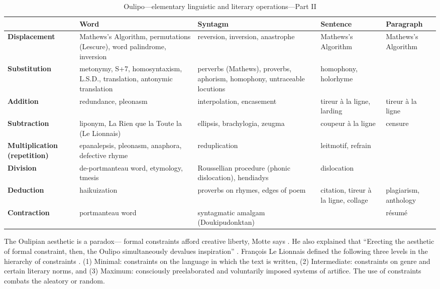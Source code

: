 \begin{table}[!htbp]
\caption[Oulipo operations II]{Oulipo---elementary linguistic and literary operations---Part II}
\label{tab:oulipo2}
{\footnotesize
\begin{tabu}{X[l,0.85]X[l,1.2]X[l,1.2]X[l,0.7]X[l,0.7]}
  \toprule
  & \textbf{Word}
  & \textbf{Syntagm}
  & \textbf{Sentence}
  & \textbf{Paragraph}
  \\ \midrule
  \textbf{Displacement} 
  & Mathews's Algorithm, permutations (Lescure), word palindrome, inversion
  & reversion, inversion, anastrophe
  & Mathews's Algorithm
  & Mathews's Algorithm
  \\
  \textbf{Substitution} 
  & metonymy, S+7, homosyntaxism, L.S.D., translation, antonymic translation
  & perverbs (Mathews), proverbs, aphorism, homophony, untraceable locutions
  & homophony, holorhyme
  &
  \\
  \textbf{Addition} 
  & redundance, pleonasm
  & interpolation, encasement
  & tireur {\`a} la ligne, larding
  & tireur {\`a} la ligne
  \\
  \textbf{Subtraction} 
  & liponym, La Rien que la Toute la (Le Lionnais)
  & ellipsis, brachylogia, zeugma
  & coupeur {\`a} la ligne
  & censure
  \\
  \textbf{Multiplication (repetition)} 
  & epanalepsis, pleonasm, anaphora, defective rhyme
  & reduplication
  & leitmotif, refrain
  &
  \\
  \textbf{Division} 
  & de-portmanteau word, etymology, tmesis 
  & Roussellian procedure (phonic dislocation), hendiadys
  & dislocation
  &
  \\
  \textbf{Deduction} 
  & haikuization
  & proverbs on rhymes, edges of poem
  & citation, tireur {\`a} la ligne, collage
  & plagiarism, anthology
  \\
  \textbf{Contraction}
  & portmanteau word
  & syntagmatic amalgam (Doukipudonktan)
  &
  & r{\'e}sum{\'e}
  \\
  \bottomrule
\end{tabu}
}
\end{table}

The Oulipian aesthetic is a paradox--- formal constraints afford creative liberty, Motte says \autocite*{Motte2007}. He also explained that ``Erecting the aesthetic of formal constraint, then, the Oulipo simultaneously devalues inspiration'' \autocite*{Motte2007}. François Le Lionnais defined the following three levels in the hierarchy of constraints \autocite{Motte2007}. (1) Minimal: constraints on the language in which the text is written, (2) Intermediate: constraints on genre and certain literary norms, and (3) Maximum: consciously preelaborated and voluntarily imposed systems of artifice. The use of constraints combats the aleatory or random.

